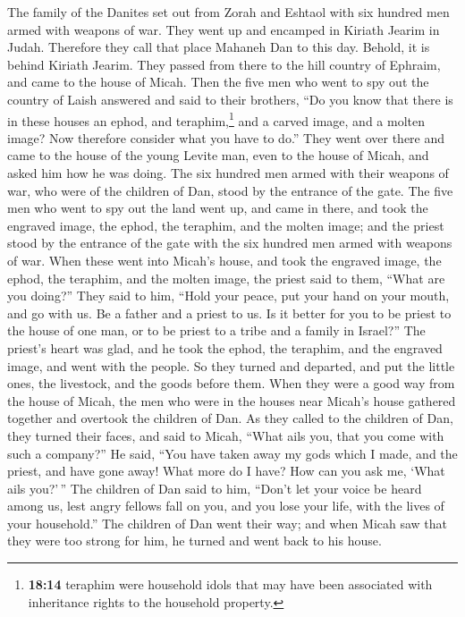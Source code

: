  The family of the Danites set out from Zorah and Eshtaol
with six hundred men armed with weapons of war.  They
went up and encamped in Kiriath Jearim in Judah. Therefore they call
that place Mahaneh Dan to this day. Behold, it is behind Kiriath Jearim.
 They passed from there to the hill country of Ephraim,
and came to the house of Micah.  Then the five men who
went to spy out the country of Laish answered and said to their
brothers, ``Do you know that there is in these houses an ephod, and
teraphim,\footnote{\textbf{18:14} teraphim were household idols that may
  have been associated with inheritance rights to the household
  property.} and a carved image, and a molten image? Now therefore
consider what you have to do.''  They went over there and
came to the house of the young Levite man, even to the house of Micah,
and asked him how he was doing.  The six hundred men
armed with their weapons of war, who were of the children of Dan, stood
by the entrance of the gate.  The five men who went to
spy out the land went up, and came in there, and took the engraved
image, the ephod, the teraphim, and the molten image; and the priest
stood by the entrance of the gate with the six hundred men armed with
weapons of war.  When these went into Micah's house, and
took the engraved image, the ephod, the teraphim, and the molten image,
the priest said to them, ``What are you doing?''  They
said to him, ``Hold your peace, put your hand on your mouth, and go with
us. Be a father and a priest to us. Is it better for you to be priest to
the house of one man, or to be priest to a tribe and a family in
Israel?''  The priest's heart was glad, and he took the
ephod, the teraphim, and the engraved image, and went with the people.
 So they turned and departed, and put the little ones,
the livestock, and the goods before them.  When they were
a good way from the house of Micah, the men who were in the houses near
Micah's house gathered together and overtook the children of Dan.
 As they called to the children of Dan, they turned their
faces, and said to Micah, ``What ails you, that you come with such a
company?''  He said, ``You have taken away my gods which
I made, and the priest, and have gone away! What more do I have? How can
you ask me, `What ails you?'\,''  The children of Dan
said to him, ``Don't let your voice be heard among us, lest angry
fellows fall on you, and you lose your life, with the lives of your
household.''  The children of Dan went their way; and
when Micah saw that they were too strong for him, he turned and went
back to his house.

